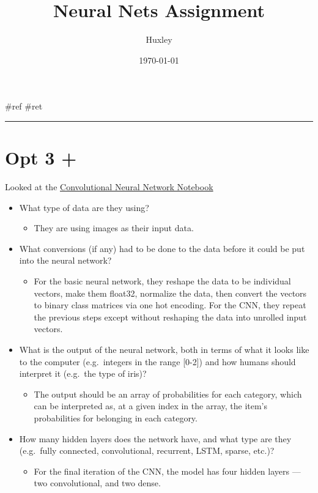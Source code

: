 \documentclass[letterpaper]{article}
\author{Huxley}
\date{\today}
\title{Neural Nets Assignment}
\renewcommand{\tableofcontents}{}
\begin{document}
\tableofcontents

\#ref \#ret

\noindent\rule{\textwidth}{0.5pt}

\section{Opt 3 +}
\label{sec:org593ef2a}
Looked at the
\href{https://github.com/ml4a/ml4a-guides/blob/master/notebooks/convolutional\_neural\_networks.ipynb}{Convolutional
Neural Network Notebook}

\begin{itemize}
\item What type of data are they using?

\begin{itemize}
\item They are using images as their input data.
\end{itemize}

\item What conversions (if any) had to be done to the data before it could
be put into the neural network?

\begin{itemize}
\item For the basic neural network, they reshape the data to be individual
vectors, make them float32, normalize the data, then convert the
vectors to binary class matrices via one hot encoding. For the CNN,
they repeat the previous steps except without reshaping the data
into unrolled input vectors.
\end{itemize}

\item What is the output of the neural network, both in terms of what it
looks like to the computer (e.g. integers in the range [0-2]) and how
humans should interpret it (e.g. the type of iris)?

\begin{itemize}
\item The output should be an array of probabilities for each category,
which can be interpreted as, at a given index in the array, the
item's probabilities for belonging in each category.
\end{itemize}

\item How many hidden layers does the network have, and what type are they
(e.g. fully connected, convolutional, recurrent, LSTM, sparse, etc.)?

\begin{itemize}
\item For the final iteration of the CNN, the model has four hidden layers
--- two convolutional, and two dense.
\end{itemize}


\end{itemize}
\end{document}
